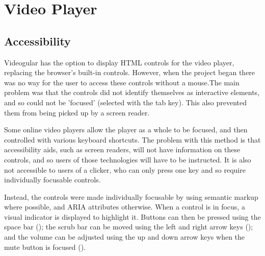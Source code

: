 \chapter{Video Player} 
\label{Chapter:Video Player}

\section{Accessibility} 
\label{Section:Accessibility}
Videogular has the option to display HTML controls for the video player, replacing the browser's built-in controls. However, when the project began there was no way for the user to access these controls without a mouse.The main problem was that the controls did not identify themselves as interactive elements, and so could not be 'focused' (selected with the tab key). This also prevented them from being picked up by a screen reader.

Some online video players allow the player as a whole to be focused, and then controlled with various keyboard shortcuts. The problem with this method is that accessibility aids, such as screen readers, will not have information on these controls, and so users of those technologies will have to be instructed. It is also not accessible to users of a clicker, who can only press one key and so require individually focusable controls.

Instead, the controls were made individually focusable by using semantic markup where possible, and ARIA attributes otherwise. When a control is in focus, a visual indicator is displayed to highlight it. Buttons can then be pressed using the space bar (); the scrub bar can be moved using the left and right arrow keys (); and the volume can be adjusted using the up and down arrow keys when the mute button is focused ().

